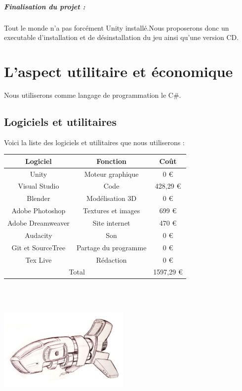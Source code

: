 \documentclass[10pt, titlepage]{report}
\begin{document}
\paragraph{Finalisation du projet :}
Tout le monde n'a pas forcément Unity installé.Nous proposerons donc un executable d'installation et de désinstallation du jeu ainsi qu'une version CD.

\chapter{L'aspect utilitaire et économique}

Nous utiliserons comme langage de programmation le C\#.

\section{Logiciels et utilitaires}

Voici la liste des logiciels et utilitaires que nous utiliserons :\\

\begin{tabular}{|c|c|c|}
\hline
Logiciel & Fonction & Coût\\
\hline
Unity & Moteur graphique & 0 \euro\\
\hline
Visual Studio & Code & 428,29 \euro\\
\hline
Blender & Modélisation 3D & 0 \euro\\
\hline
Adobe Photoshop & Textures et images & 699 \euro\\
\hline
Adobe Dreamweaver & Site internet & 470 \euro\\
\hline
Audacity & Son & 0 \euro\\
\hline
Git et SourceTree & Partage du programme & 0 \euro\\
\hline
Tex Live & Rédaction & 0 \euro\\
\hline
\multicolumn{2}{|c|}{Total } & 1597,29 \euro\\
\hline
\end{tabular}\\
\\

\begin{center}
\includegraphics[height=4cm, width=6.4cm]{b.jpg}
\end{center}
\end{document}
